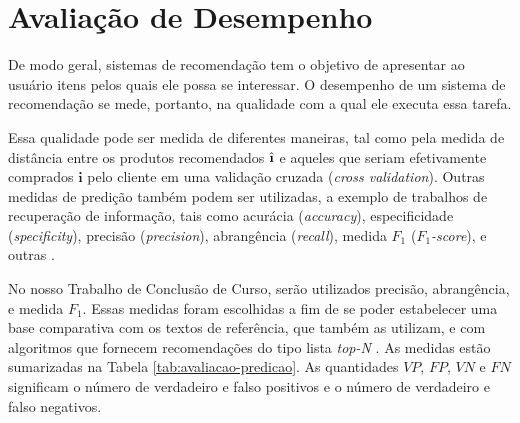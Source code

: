\section{Avaliação de Desempenho} %
\label{cha:avalia_o_de_desempenho}




De modo geral, sistemas de recomendação tem o objetivo de apresentar ao usuário itens pelos quais ele possa se interessar. O desempenho de um sistema de recomendação se mede, portanto, na qualidade com a qual ele executa essa tarefa. 

Essa qualidade pode ser medida de diferentes maneiras, tal como pela medida de distância entre os produtos recomendados $\hat{\textbf{\i}}$ e aqueles que seriam efetivamente comprados $\textbf{i}$ pelo cliente em uma validação cruzada (\textit{cross validation}). Outras medidas de predição também podem ser utilizadas, a exemplo de trabalhos de recuperação de informação, tais como acurácia (\textit{accuracy}), especificidade (\textit{specificity}), precisão (\textit{precision}), abrangência (\textit{recall}), medida $F_1$ (\textit{$F_1$-score}), e outras \cite{herlocker2004evaluating}. 

No nosso Trabalho de Conclusão de Curso, serão utilizados precisão, abrangência, e medida $F_1$. Essas medidas foram escolhidas a fim de se poder estabelecer uma base comparativa com os textos de referência, que também as utilizam, e com  algoritmos que fornecem recomendações do tipo lista \textit{top-N}  \cite{cremonesi2010performance}. As medidas estão sumarizadas na Tabela \ref{tab:avaliacao-predicao}. As quantidades $VP$, $FP$, $VN$ e $FN$ significam o número de verdadeiro e falso positivos e o número de verdadeiro e falso negativos.



